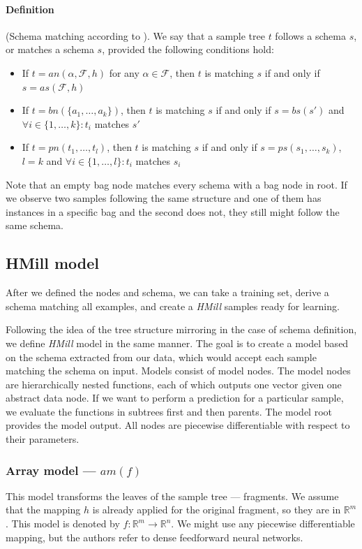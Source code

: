 \paragraph{Definition} (Schema matching according to \cite{Mandlik2020}). We say that a sample tree $t$ follows a schema $s$, or matches a schema $s$, provided the following conditions hold:
\begin{itemize}
    \itemsep0em 
    \item If $t=an(\alpha,\mathcal{F},h)$ for any $\alpha\in\mathcal{F}$, then $t$ is matching $s$ if and only if $s=as(\mathcal{F},h)$
    \item If $t=bn(\{a_1,\dots,a_k\})$, then $t$ is matching $s$ if and only if $s=bs(s')$ and $\forall i\in\{1,\dots,k\}:t_i$ matches $s'$
    \item If $t=pn(t_1,\dots,t_l)$, then $t$ is matching $s$ if and only if $s=ps(s_1,\dots,s_k)$,$l=k$ and $\forall i\in\{1,\dots,l\}:t_i$ matches $s_i$
\end{itemize}

Note that an empty bag node matches every schema with a bag node in root. If we observe two samples following the same structure and one of them has instances in a specific bag and the second does not, they still might follow the same schema.

\subsection{HMill model}
After we defined the nodes and schema, we can take a training set, derive a schema matching all examples, and create a \emph{HMill} samples ready for learning. 

Following the idea of the tree structure mirroring in the case of schema definition, we define \emph{HMill} model in the same manner. The goal is to create a model based on the schema extracted from our data, which would accept each sample matching the schema on input. Models consist of model nodes. The model nodes are hierarchically nested functions, each of which outputs one vector given one abstract data node. If we want to perform a prediction for a particular sample, we evaluate the functions in subtrees first and then parents. The model root provides the model output. All nodes are piecewise differentiable with respect to their parameters.

\subsubsection{Array model --- $am(f)$}
This model transforms the leaves of the sample tree --- fragments. We assume that the mapping $h$ is already applied for the original fragment, so they are in $\mathbb{R}^m$.  This model is denoted by $f:\mathbb{R}^m\rightarrow\mathbb{R}^n$. We might use any piecewise differentiable mapping, but the authors refer to dense feedforward neural networks.

